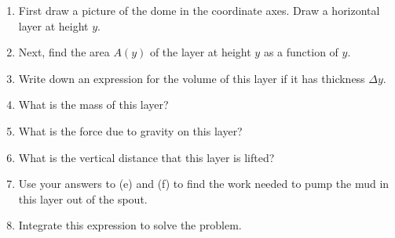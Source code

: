 \documentclass[12pt]{article}
\begin{document}
\begin{enumerate}
\begin{enumerate}
\item First draw a picture of the dome in the coordinate axes. 
Draw a horizontal layer at height $y$.
\vfill\vfill
\item Next, find the area $A(y)$ of the layer at height $y$ as a function of $y$.
\vfill
\item Write down an expression for the volume of this layer if it has thickness $\Delta y$.
\vfill
\item What is the mass of this layer?
\vfill
\pagebreak
\item What is the force due to gravity on this layer? 
\vfill
\item What is the vertical distance that this layer is lifted?
\vfill
\item Use your answers to (e) and (f) to find the work needed to pump the mud in this layer out of the spout.
\vfill
\item Integrate this expression to solve the problem.
\vfill
\end{enumerate}

\end{enumerate}
\end{document}
